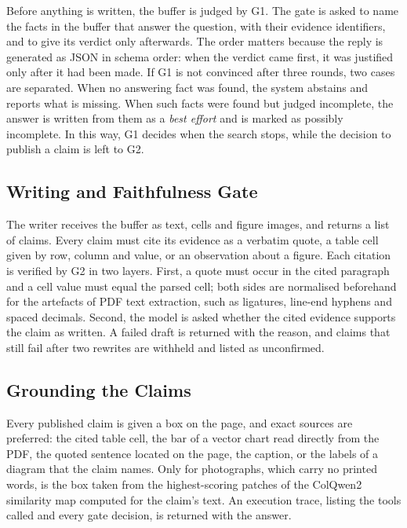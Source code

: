Before anything is written, the buffer is judged by G1. The gate is asked to name the
facts in the buffer that answer the question, with their evidence identifiers, and to
give its verdict only afterwards. The order matters because the reply is generated as
JSON in schema order: when the verdict came first, it was justified only after it had
been made. If G1 is not convinced after three rounds, two cases are separated. When no
answering fact was found, the system abstains and reports what is missing. When such
facts were found but judged incomplete, the answer is written from them as a
\emph{best effort} and is marked as possibly incomplete. In this way, G1 decides when
the search stops, while the decision to publish a claim is left to G2.

\subsection{Writing and Faithfulness Gate}

The writer receives the buffer as text, cells and figure images, and returns a list of
claims. Every claim must cite its evidence as a verbatim quote, a table cell given by
row, column and value, or an observation about a figure. Each citation is verified by
G2 in two layers. First, a quote must occur in the cited paragraph and a cell value
must equal the parsed cell; both sides are normalised beforehand for the artefacts of
PDF text extraction, such as ligatures, line-end hyphens and spaced decimals. Second,
the model is asked whether the cited evidence supports the claim as written. A failed
draft is returned with the reason, and claims that still fail after two rewrites are
withheld and listed as unconfirmed.

\subsection{Grounding the Claims}

Every published claim is given a box on the page, and exact sources are preferred: the
cited table cell, the bar of a vector chart read directly from the PDF, the quoted
sentence located on the page, the caption, or the labels of a diagram that the claim
names. Only for photographs, which carry no printed words, is the box taken from the
highest-scoring patches of the ColQwen2 similarity map computed for the claim's text.
An execution trace, listing the tools called and every gate decision, is returned with
the answer.
